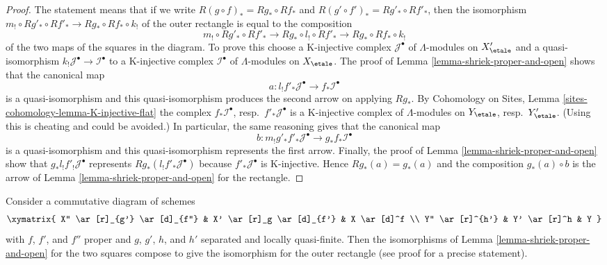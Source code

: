 \begin{proof}
The statement means that if we write
$R(g \circ f)_* = Rg_* \circ Rf_*$ and
$R(g' \circ f')_* = Rg'_* \circ Rf'_*$,
then the isomorphism
$m_! \circ Rg'_* \circ Rf'_* \to Rg_* \circ Rf_* \circ k_!$
of the outer rectangle is equal to the composition
$$
m_! \circ Rg'_* \circ Rf'_* \to
Rg_* \circ l_! \circ Rf'_* \to
Rg_* \circ Rf_* \circ k_!
$$
of the two maps of the squares in the diagram. To prove this choose
a K-injective complex $\mathcal{J}^\bullet$ of $\Lambda$-modules
on $X'_\etale$ and a quasi-isomorphism
$k_!\mathcal{J}^\bullet \to \mathcal{I}^\bullet$
to a K-injective complex $\mathcal{I}^\bullet$ of $\Lambda$-modules
on $X_\etale$. The proof of Lemma \ref{lemma-shriek-proper-and-open}
shows that the canonical map
$$
a : l_!f'_*\mathcal{J}^\bullet \to f_*\mathcal{I}^\bullet
$$
is a quasi-isomorphism and this quasi-isomorphism produces the
second arrow on applying $Rg_*$. By
Cohomology on Sites, Lemma \ref{sites-cohomology-lemma-K-injective-flat}
the complex $f_*\mathcal{I}^\bullet$, resp.\ $f'_*\mathcal{J}^\bullet$
is a K-injective complex of $\Lambda$-modules on 
$Y_\etale$, resp.\ $Y'_\etale$.
(Using this is cheating and could be avoided.)
In particular, the same reasoning gives that the canonical map
$$
b : m_!g'_*f'_*\mathcal{J}^\bullet \to g_*f_*\mathcal{I}^\bullet
$$
is a quasi-isomorphism and this quasi-isomorphism represents
the first arrow. Finally, the proof of Lemma \ref{lemma-shriek-proper-and-open}
show that $g_*l_!f'_!\mathcal{J}^\bullet$ represents
$Rg_*(l_!f'_*\mathcal{J}^\bullet)$ because $f'_*\mathcal{J}^\bullet$
is K-injective. Hence $Rg_*(a) = g_*(a)$ and the composition
$g_*(a) \circ b$ is the arrow of Lemma \ref{lemma-shriek-proper-and-open}
for the rectangle.
\end{proof}

\begin{lemma}
\label{lemma-shriek-proper-and-open-compose-horizontal}
Consider a commutative diagram of schemes
$$
\xymatrix{
X'' \ar[r]_{g'} \ar[d]_{f''} &
X' \ar[r]_g \ar[d]_{f'} &
X \ar[d]^f \\
Y'' \ar[r]^{h'} &
Y' \ar[r]^h &
Y
}
$$
with $f$, $f'$, and $f''$ proper and
$g$, $g'$, $h$, and $h'$ separated and locally quasi-finite.
Then the isomorphisms of Lemma \ref{lemma-shriek-proper-and-open}
for the two squares compose to give the isomorphism
for the outer rectangle (see proof for a precise statement).
\end{lemma}

